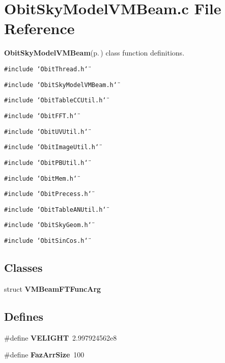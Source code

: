 \section{Obit\-Sky\-Model\-VMBeam.c File Reference}
\label{ObitSkyModelVMBeam_8c}
{\bf Obit\-Sky\-Model\-VMBeam}{\rm (p.\,\pageref{structObitSkyModelVMBeam})} class function definitions. 

{\tt \#include \char`\"{}Obit\-Thread.h\char`\"{}}\par
{\tt \#include \char`\"{}Obit\-Sky\-Model\-VMBeam.h\char`\"{}}\par
{\tt \#include \char`\"{}Obit\-Table\-CCUtil.h\char`\"{}}\par
{\tt \#include \char`\"{}Obit\-FFT.h\char`\"{}}\par
{\tt \#include \char`\"{}Obit\-UVUtil.h\char`\"{}}\par
{\tt \#include \char`\"{}Obit\-Image\-Util.h\char`\"{}}\par
{\tt \#include \char`\"{}Obit\-PBUtil.h\char`\"{}}\par
{\tt \#include \char`\"{}Obit\-Mem.h\char`\"{}}\par
{\tt \#include \char`\"{}Obit\-Precess.h\char`\"{}}\par
{\tt \#include \char`\"{}Obit\-Table\-ANUtil.h\char`\"{}}\par
{\tt \#include \char`\"{}Obit\-Sky\-Geom.h\char`\"{}}\par
{\tt \#include \char`\"{}Obit\-Sin\-Cos.h\char`\"{}}\par
\subsection*{Classes}
\begin{CompactItemize}
\item 
struct {\bf VMBeam\-FTFunc\-Arg}
\end{CompactItemize}
\subsection*{Defines}
\begin{CompactItemize}
\item 
\#define {\bf VELIGHT}\ 2.997924562e8
\item 
\#define {\bf Faz\-Arr\-Size}\ 100
\end{CompactItemize}
